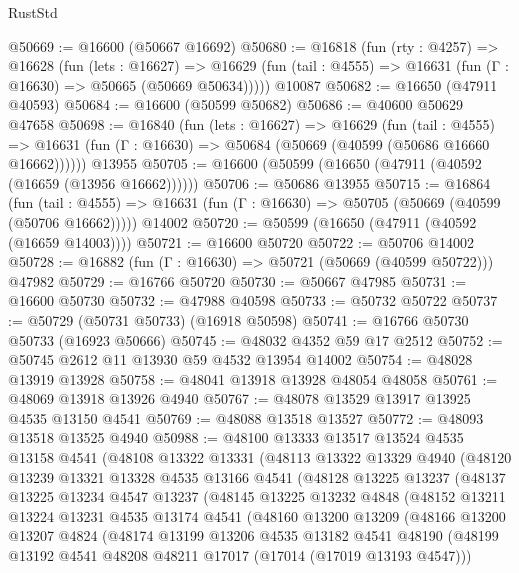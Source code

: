 \begin{lexlean}{RustStd}
\begin{coremodule}
@50669 := @16600 (@50667 @16692)
@50680 := @16818
    (fun (rty : @4257) =>
    @16628
      (fun (lets : @16627) =>
      @16629 (fun (tail : @4555) => @16631 (fun (Γ : @16630) => @50665 (@50669 @50634)))))
    @10087
@50682 := @16650 (@47911 @40593)
@50684 := @16600 (@50599 @50682)
@50686 := @40600 @50629 @47658
@50698 := @16840
    (fun (lets : @16627) =>
    @16629
      (fun (tail : @4555) =>
      @16631 (fun (Γ : @16630) => @50684 (@50669 (@40599 (@50686 @16660 @16662))))))
    @13955
@50705 := @16600 (@50599 (@16650 (@47911 (@40592 (@16659 (@13956 @16662))))))
@50706 := @50686 @13955
@50715 := @16864
    (fun (tail : @4555) => @16631 (fun (Γ : @16630) => @50705 (@50669 (@40599 (@50706 @16662)))))
    @14002
@50720 := @50599 (@16650 (@47911 (@40592 (@16659 @14003))))
@50721 := @16600 @50720
@50722 := @50706 @14002
@50728 := @16882 (fun (Γ : @16630) => @50721 (@50669 (@40599 @50722))) @47982
@50729 := @16766 @50720
@50730 := @50667 @47985
@50731 := @16600 @50730
@50732 := @47988 @40598
@50733 := @50732 @50722
@50737 := @50729 (@50731 @50733) (@16918 @50598)
@50741 := @16766 @50730 @50733 (@16923 @50666)
@50745 := @48032 @4352 @59 @17 @2512
@50752 := @50745 @2612 @11 @13930 @59 @4532 @13954 @14002
@50754 := @48028 @13919 @13928
@50758 := @48041 @13918 @13928 @48054 @48058
@50761 := @48069 @13918 @13926 @4940
@50767 := @48078 @13529 @13917 @13925 @4535 @13150 @4541
@50769 := @48088 @13518 @13527
@50772 := @48093 @13518 @13525 @4940
@50988 := @48100
    @13333
    @13517
    @13524
    @4535
    @13158
    @4541
    (@48108
      @13322
      @13331
      (@48113
        @13322
        @13329
        @4940
        (@48120
          @13239
          @13321
          @13328
          @4535
          @13166
          @4541
          (@48128
            @13225
            @13237
            (@48137
              @13225
              @13234
              @4547
              @13237
              (@48145
                @13225
                @13232
                @4848
                (@48152
                  @13211
                  @13224
                  @13231
                  @4535
                  @13174
                  @4541
                  (@48160
                    @13200
                    @13209
                    (@48166
                      @13200
                      @13207
                      @4824
                      (@48174
                        @13199
                        @13206
                        @4535
                        @13182
                        @4541
                        @48190
                        (@48199 @13192 @4541 @48208 @48211 @17017 (@17014 (@17019 @13193 @4547)))

\end{coremodule}
\end{lexlean}
